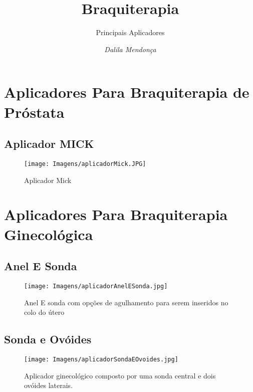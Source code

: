 \documentclass[11pt,a4paper]{article}
\title{Braquiterapia}
\author{Principais Aplicadores\nocite{*}}
\date{\textit{Dalila Mendonça}}
\begin{document}
	\maketitle

    \section{Aplicadores Para Braquiterapia de Próstata}

        \subsection{Aplicador MICK}

            \begin{figure}[h]
                \centering
                \texttt{[image: Imagens/aplicadorMick.JPG]}
                \caption{Aplicador Mick}
            \end{figure}

    \pagebreak
    \section{Aplicadores Para Braquiterapia Ginecológica}

        \subsection{Anel E Sonda}

            \begin{figure}[h]
                \centering
                \texttt{[image: Imagens/aplicadorAnelESonda.jpg]}
                \caption{Anel E sonda com opções de agulhamento para serem inseridos no colo do útero}
            \end{figure}
        
        \subsection{Sonda e Ovóides}
        
            \begin{figure}[h]
                \centering
                \texttt{[image: Imagens/aplicadorSondaEOvoides.jpg]}
                \caption{Aplicador ginecológico composto por uma sonda central e dois ovóides laterais.}
            \end{figure}

    \pagebreak
\end{document}
